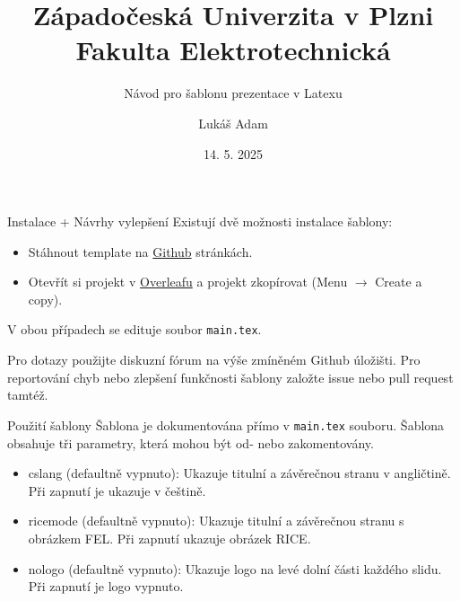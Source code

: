 \documentclass[11pt, aspectratio=169]{beamer}
\title[]{Západočeská Univerzita v Plzni \\ Fakulta Elektrotechnická}
\author{Lukáš Adam}
\date{14. 5. 2025}
\subtitle{Návod pro šablonu prezentace v Latexu}
\begin{document}
\begin{frame}
	\maketitle
\end{frame}



\begin{frame}{Instalace + Návrhy vylepšení}
Existují dvě možnosti instalace šablony:
\begin{itemize}
\item Stáhnout template na \href{https://github.com/sadda/uwb-fee-template}{Github} stránkách.
\item Otevřít si projekt v \href{https://www.overleaf.com/read/mqszxcxvgjcj\#620afc}{Overleafu} a projekt zkopírovat (Menu $\rightarrow$ Create a copy).
\end{itemize}
V obou případech se edituje soubor \texttt{main.tex}.

\vspace{5mm}

Pro dotazy použijte diskuzní fórum na výše zmíněném Github úložišti. Pro reportování chyb nebo zlepšení funkčnosti šablony založte issue nebo pull request tamtéž.
\end{frame}



\begin{frame}{Použití šablony}
Šablona je dokumentována přímo v \texttt{main.tex} souboru. Šablona obsahuje tři parametry, která mohou být od- nebo zakomentovány.
\begin{itemize}
\item cslang (defaultně vypnuto): Ukazuje titulní a závěrečnou stranu v angličtině. Při zapnutí je ukazuje v češtině.
\item ricemode (defaultně vypnuto): Ukazuje titulní a závěrečnou stranu s obrázkem FEL. Při zapnutí ukazuje obrázek RICE.
\item nologo (defaultně vypnuto): Ukazuje logo na levé dolní části každého slidu. Při zapnutí je logo vypnuto.
\end{itemize}
\end{frame}



\begin{frame}
\end{frame}
\end{document}
